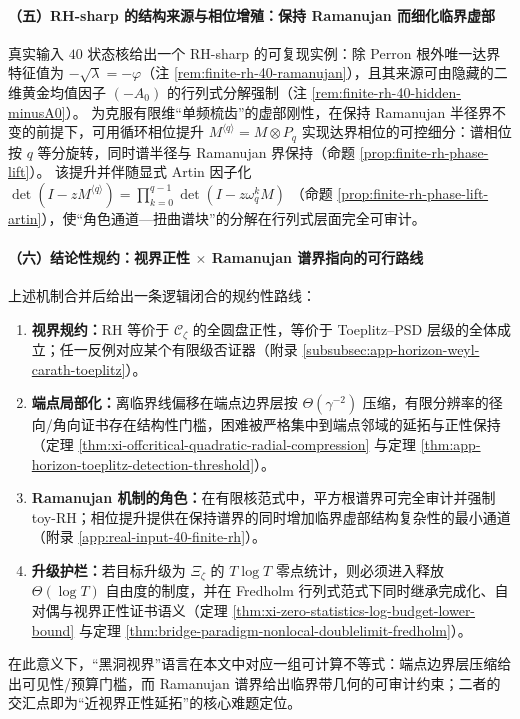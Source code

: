 \paragraph{（五）RH-sharp 的结构来源与相位增殖：保持 Ramanujan 而细化临界虚部}
真实输入 \(40\) 状态核给出一个 RH-sharp 的可复现实例：除 Perron 根外唯一达界特征值为 \(-\sqrt{\lambda}=-\varphi\)（注 \ref{rem:finite-rh-40-ramanujan}），且其来源可由隐藏的二维黄金均值因子 \((-A_0)\) 的行列式分解强制（注 \ref{rem:finite-rh-40-hidden-minusA0}）。
为克服有限维“单频梳齿”的虚部刚性，在保持 Ramanujan 半径界不变的前提下，可用循环相位提升
\(
M^{\langle q\rangle}=M\otimes P_q
\)
实现达界相位的可控细分：谱相位按 \(q\) 等分旋转，同时谱半径与 Ramanujan 界保持（命题 \ref{prop:finite-rh-phase-lift}）。
该提升并伴随显式 Artin 因子化
\(
\det(I-zM^{\langle q\rangle})=\prod_{k=0}^{q-1}\det(I-z\omega_q^k M)
\)
（命题 \ref{prop:finite-rh-phase-lift-artin}），使“角色通道—扭曲谱块”的分解在行列式层面完全可审计。

\paragraph{（六）结论性规约：视界正性 \(\times\) Ramanujan 谱界指向的可行路线}
上述机制合并后给出一条逻辑闭合的规约性路线：
\begin{enumerate}
  \item \textbf{视界规约：}RH 等价于 \(\mathscr{C}_{\zeta}\) 的全圆盘正性，等价于 Toeplitz--PSD 层级的全体成立；任一反例对应某个有限级否证器（附录 \ref{subsubsec:app-horizon-weyl-carath-toeplitz}）。
  \item \textbf{端点局部化：}离临界线偏移在端点边界层按 \(\Theta(\gamma^{-2})\) 压缩，有限分辨率的径向/角向证书存在结构性门槛，困难被严格集中到端点邻域的延拓与正性保持（定理 \ref{thm:xi-offcritical-quadratic-radial-compression} 与定理 \ref{thm:app-horizon-toeplitz-detection-threshold}）。
  \item \textbf{Ramanujan 机制的角色：}在有限核范式中，平方根谱界可完全审计并强制 toy-RH；相位提升提供在保持谱界的同时增加临界虚部结构复杂性的最小通道（附录 \ref{app:real-input-40-finite-rh}）。
  \item \textbf{升级护栏：}若目标升级为 \(\Xi_{\zeta}\) 的 \(T\log T\) 零点统计，则必须进入释放 \(\Theta(\log T)\) 自由度的制度，并在 Fredholm 行列式范式下同时继承完成化、自对偶与视界正性证书语义（定理 \ref{thm:xi-zero-statistics-log-budget-lower-bound} 与定理 \ref{thm:bridge-paradigm-nonlocal-doublelimit-fredholm}）。
\end{enumerate}
在此意义下，“黑洞视界”语言在本文中对应一组可计算不等式：端点边界层压缩给出可见性/预算门槛，而 Ramanujan 谱界给出临界带几何的可审计约束；二者的交汇点即为“近视界正性延拓”的核心难题定位。

\endinput

